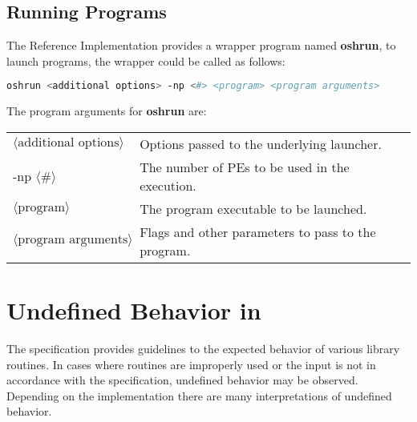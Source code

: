 \section{Running Programs}

The  \openshmem{} Reference Implementation provides a wrapper program named
\textbf{oshrun}, to launch \openshmem programs, the wrapper could be called as
follows:

\begin{lstlisting}[language=bash]
oshrun <additional options> -np <#> <program> <program arguments>
\end{lstlisting}
The program arguments for \textbf{oshrun} are:

\begin{tabular}{p{}p{}}
$\langle\mbox{additional options}\rangle$ & {Options passed to the underlying launcher.}\tabularnewline
-np $\langle\mbox{\#}\rangle$ & {The number of \ac{PE}s to be used in the execution.}\tabularnewline
$\langle\mbox{program}\rangle$ & {The program executable to be launched.}\tabularnewline
$\langle\mbox{program arguments}\rangle$ & {Flags and other parameters to pass to the program.}\tabularnewline
\end{tabular}





\chapter{Undefined Behavior in \openshmem}\label{sec:undefined}

The specification provides guidelines to the expected behavior of
various library routines.  In cases where routines are improperly used
or the input is not in accordance with the specification, undefined
behavior may be observed.  Depending on the implementation there are
many interpretations of undefined behavior. 

$\;$

